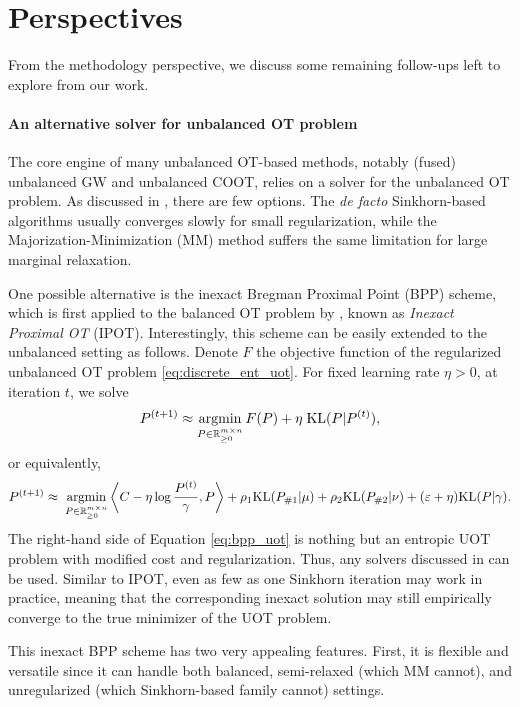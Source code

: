 \section{Perspectives}

From the methodology perspective, we discuss some remaining follow-ups left to explore from our work.

\paragraph{An alternative solver for unbalanced OT problem}
The core engine of many unbalanced OT-based methods, notably (fused) unbalanced GW and unbalanced COOT,
relies on a solver for the unbalanced OT problem. As discussed in ,
there are few options. The \textit{de facto} Sinkhorn-based algorithms \citep{Sejourne19,Sejourne21}
usually converges slowly for small regularization, while the
Majorization-Minimization (MM) method \citep{Chapel21}
suffers the same limitation for large marginal relaxation.

One possible alternative is the inexact Bregman Proximal Point (BPP) scheme,
which is first applied to the balanced OT problem by \citet{Xie20},
known as \textit{Inexact Proximal OT} (IPOT). Interestingly,
this scheme can be easily extended to the unbalanced setting as follows.
Denote $F$ the objective function of the regularized unbalanced OT problem \eqref{eq:discrete_ent_uot}.
For fixed learning rate $\eta > 0$, at iteration $t$, we solve
\begin{align}
  \label{eq:bpp_eot}
  P^{(t+1)} \approx \operatorname*{argmin}_{P \in \mathbb R^{m \times n}_{\geq 0}} F(P) + \eta \; \text{KL}(P | P^{(t)}),
\end{align}
or equivalently,
\begin{align}
\label{eq:bpp_uot}
  P^{(t+1)} \approx \; \operatorname*{argmin}_{P \in \mathbb R^{m \times n}_{\geq 0}}
  \left \langle C - \eta \log \frac{P^{(t)}}{\gamma}, P \right \rangle
  + \rho_1 \text{KL}(P_{\# 1} | \mu) + \rho_2 \text{KL}(P_{\# 2} | \nu) + (\varepsilon + \eta) \text{KL}(P | \gamma).
\end{align}
The right-hand side of Equation \eqref{eq:bpp_uot} is nothing but an entropic UOT problem
with modified cost and regularization. Thus, any solvers discussed in 
can be used. Similar to IPOT, even as few as one Sinkhorn iteration may work in practice,
meaning that the corresponding inexact solution may still empirically converge to the true minimizer
of the UOT problem.

This inexact BPP scheme has two very appealing features. First, it is flexible and versatile since
it can handle both balanced, semi-relaxed (which MM cannot), and unregularized
(which Sinkhorn-based family cannot) settings.

